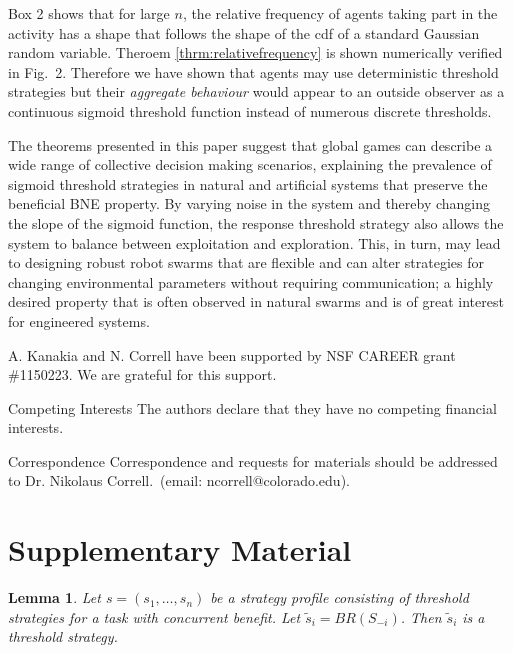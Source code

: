 \documentclass{nature}
\newtheorem{lemma}{Lemma}
\begin{document}
\linenumbers
Box 2 shows that for large $n$, the relative frequency of agents taking part in the activity has a shape that follows the shape of the cdf of a standard Gaussian random variable. Theroem \ref{thrm:relativefrequency} is shown numerically verified in Fig.~2. Therefore we have shown that agents may use deterministic threshold strategies but their \emph{aggregate behaviour} would appear to an outside observer as a continuous sigmoid threshold function instead of numerous discrete thresholds.

The theorems presented in this paper suggest that global games can  describe a wide range of collective decision making scenarios, explaining the prevalence of sigmoid threshold strategies in natural and artificial systems that preserve the beneficial BNE property. By varying noise in the system and thereby changing the slope of the sigmoid function, the response threshold strategy also allows the system to balance between exploitation and exploration. This, in turn, may lead to designing robust robot swarms that are flexible and can alter strategies for changing environmental parameters without requiring communication; a highly desired property that is often observed in natural swarms and is of great interest for engineered systems.

\nolinenumbers


\begin{addendum}
 \item A. Kanakia and N. Correll have been supported by NSF CAREER grant \#1150223. We are grateful for this support. 
 \item[Competing Interests] The authors declare that they have no
competing financial interests.
 \item[Correspondence] Correspondence and requests for materials
should be addressed to Dr. Nikolaus Correll.~(email: ncorrell@colorado.edu).
\end{addendum}


\newpage
\section*{Supplementary Material}

\setcounter{lemma}{0}
\begin{lemma}
Let $s=(s_1,\ldots,s_n)$ be a strategy profile consisting of threshold strategies for a task with  concurrent benefit. Let $\tilde{s}_i=BR(S_{-i})$. Then $\tilde{s}_i$ is a threshold strategy. 
\end{lemma} 
\end{document}
